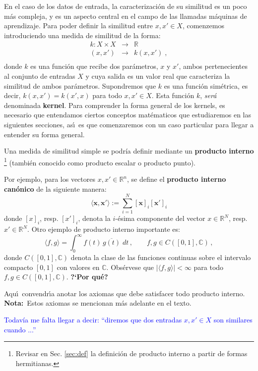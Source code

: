 En el caso de los datos de entrada, la caracterizaci\'on de  su
similitud es un poco m\'as compleja, y es un aspecto central en el campo de
las llamadas m\'aquinas de aprendizaje.
Para poder definir la similitud entre $x,x'\in X$, comenzemos introduciendo una medida de similitud de la forma:
\begin{equation}
\begin{array}{rcl}
k: X\times X & \rightarrow & \mathbb{R} \\ 
    (x,x')   & \rightarrow & k(x,x')\;, \\
\end{array}
\end{equation}
donde $k$ es una funci\'on que recibe dos
par\'ametros, $x$ y $x'$, ambos pertenecientes al conjunto de entradas
$X$ y cuya salida es un valor real que caracteriza la similitud de ambos
par\'ametros.
Supondremos que $k$ es una funci\'on sim\'etrica,
es decir, $k(x,x')= k(x',x)$ para todo $x,x'\in X$.
Esta funci\'on $k$, {\em ser\'a\/} denominada {\bf kernel}.
Para comprender la forma general de los kernels, es necesario que
entendamos ciertos conceptos mat\'ematicos que estudiaremos en las siguientes
secciones,
as\'\i\ es que comenzaremos con un caso particular para llegar a entender su
forma general.


Una medida de similitud simple se podr\'ia definir mediante un \textbf{producto interno}
\footnote{Revisar en Sec. \ref{sec:def} la definici\'on de producto
interno a partir de formas hermitianas.}
(tambi\'en conocido como producto escalar o producto punto).

Por ejemplo, para los vectores $x,x'\in\mathbb{R}^n$, se define
el \textbf{producto interno can\'onico} de la siguiente manera:
\begin{equation}
\langle\mathbf{x},\mathbf{x'}\rangle
:= \sum \limits_{i=1}^{N} [\mathbf{x}]_i [\mathbf{x'}]_i 
\end{equation}
{\color{red} donde $[x]_i$, resp.  $[x']_i$, denota la $i$-\'esima
componente del vector $x\in\mathbb{R}^N$, resp.  $x'\in\mathbb{R}^N$.
Otro ejemplo de producto interno importante es:
\begin{equation*}
\langle f,g\rangle = \int_0^\infty f(t)\,\overline{g(t)}\;dt\,,\qquad
f,g\in C([0,1],\mathbb{C})\,,
\end{equation*}
donde $C([0,1],\mathbb{C})$ denota la clase de las funciones
continuas sobre el intervalo compacto $[0,1]$ con valores en
$\mathbb{C}$.
Obs\'ervese que $|\langle f,g\rangle|<\infty$ para todo
$f,g\in C([0,1],\mathbb{C})$.
{\bf ?`Por qu\'e?}}


\begin{myremark}
Aqu\'\i\ convendr\'\i a anotar los axiomas que debe satisfacer todo
producto interno.
{\bf Nota:}\ Estos axiomas se mencionan m\'as adelante en el texto.
\end{myremark}

\textcolor{blue}{Todav\'ia me falta llegar a decir: ``diremos que dos entradas
$x,x'\in X$ son similares cuando ...''}



